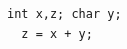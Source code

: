 \documentclass[dvipdfmx]{jarticle}
\begin{document}
\begin{minipage}{0.4\textwidth}
\begin{Verbatim}[frame=single]
  int x,z; char y;
  z = x + y;
\end{Verbatim}
\end{minipage}
\end{document}
